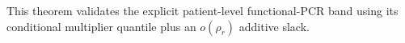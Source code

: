 This theorem validates the explicit patient-level functional-PCR band using its conditional multiplier quantile plus an \(o(\rho_r)\) additive slack.